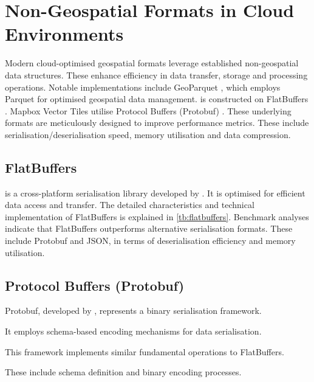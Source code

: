 \section{Non-Geospatial Formats in Cloud Environments}
\label{rw:non_geospatial_formats}

Modern cloud-optimised geospatial formats leverage established non-geospatial data structures.
These enhance efficiency in data transfer, storage and processing operations.
Notable implementations include GeoParquet \citep{geoparquet}, which employs Parquet \citep{parquet} for optimised geospatial data management.
\citet{flatgeobuf} is constructed on FlatBuffers \citep{flatbuffers}. Mapbox Vector Tiles \citep{mapbox-vector-tiles} utilise Protocol Buffers (Protobuf) \citep{protobuf}.
These underlying formats are meticulously designed to improve performance metrics.
These include serialisation/deserialisation speed, memory utilisation and data compression.

\subsection{FlatBuffers}
\label{rw:non_geospatial_formats:flatbuffers}

\citet{flatbuffers} is a cross-platform serialisation library developed by \citet{google_flatbuffers}.
It is optimised for efficient data access and transfer.
The detailed characteristics and technical implementation of FlatBuffers is explained in \autoref{tb:flatbuffers}.
Benchmark analyses \citep{flatbuffers_benchmark} indicate that FlatBuffers outperforms alternative serialisation formats.
These include Protobuf \citep{protobuf} and JSON, in terms of deserialisation efficiency and memory utilisation.

\subsection{Protocol Buffers (Protobuf)}
\label{rw:non_geospatial_formats:protobuf}

Protobuf, developed by \citet{protobuf}, represents a binary serialisation framework.

It employs schema-based encoding mechanisms for data serialisation.

This framework implements similar fundamental operations to FlatBuffers.

These include schema definition and binary encoding processes.

